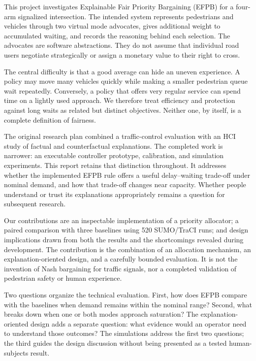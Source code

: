 \documentclass[sigconf]{acmart}
\begin{document}
This project investigates Explainable Fair Priority Bargaining (EFPB)
for a four-arm signalized intersection. The intended system represents
pedestrians and vehicles through two virtual mode advocates, gives
additional weight to accumulated waiting, and records the reasoning
behind each selection. The advocates are software abstractions. They do
not assume that individual road users negotiate strategically or assign
a monetary value to their right to cross.

The central difficulty is that a good average can hide an uneven
experience. A policy may move many vehicles quickly while making a
smaller pedestrian queue wait repeatedly. Conversely, a policy that
offers very regular service can spend time on a lightly used approach.
We therefore treat efficiency and protection against long waits as
related but distinct objectives. Neither one, by itself, is a complete
definition of fairness.

The original research plan combined a traffic-control evaluation with
an HCI study of factual and counterfactual explanations. The completed
work is narrower: an executable controller prototype, calibration, and
simulation experiments. This report retains that distinction throughout.
It addresses whether the implemented EFPB rule offers a useful
delay--waiting trade-off under nominal demand, and how that trade-off
changes near capacity. Whether people understand or trust its
explanations appropriately remains a question for subsequent research.

Our contributions are an inspectable implementation of a priority
allocator; a paired comparison with three baselines using 520
SUMO/TraCI runs; and design implications drawn from both the results
and the shortcomings revealed during development. The contribution is
the combination of an allocation mechanism, an explanation-oriented
design, and a carefully bounded evaluation. It is not the invention of
Nash bargaining for traffic signals, nor a completed validation of
pedestrian safety or human experience.

Two questions organize the technical evaluation. First, how does
EFPB compare with the baselines when demand remains within the
nominal range? Second, what breaks down when one or both modes
approach saturation? The explanation-oriented design adds a separate
question: what evidence would an operator need to understand those
outcomes? The simulations address the first two questions; the third
guides the design discussion without being presented as a tested
human-subjects result.
\end{document}
